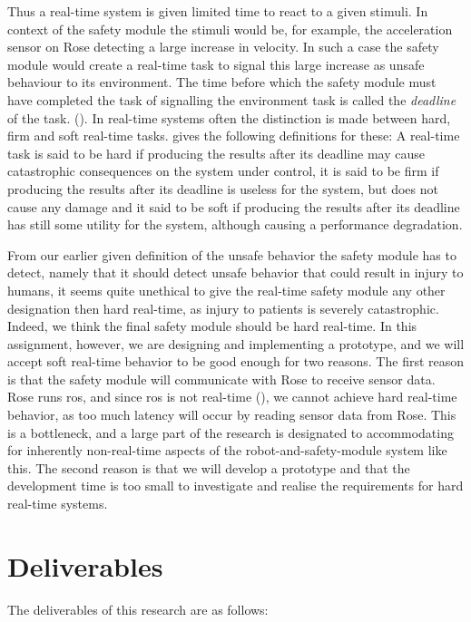 \documentclass[12pt]{scrreprt}
\begin{document}
Thus a real-time system is given limited time to react to a given stimuli. In context of the safety module the stimuli would be, for example, the acceleration sensor on Rose detecting a large increase in velocity. In such a case the safety module would create a real-time task to signal this large increase as unsafe behaviour to its environment. The time before which the safety module must have completed the task of signalling the environment task is called the \textit{deadline} of the task. (\cite{realtime_systems}). In real-time systems often the distinction is made between hard, firm and soft real-time tasks. \cite{buttazo} gives the following definitions for these: A real-time task is said to be hard if producing the results after its deadline
may cause catastrophic consequences on the system under control, it is said to be firm if producing the results after its deadline is useless for the system, but does not cause any damage and it said to be soft if producing the results after its deadline has still some utility for the system, although causing a performance degradation.
\par
From our earlier given definition of the unsafe behavior the safety module has to detect, namely that it should detect unsafe behavior that could result in injury to humans, it seems quite unethical to give the real-time safety module any other designation then hard real-time, as injury to patients is severely catastrophic. Indeed, we think the final safety module should be hard real-time. In this assignment, however, we are designing and implementing a prototype, and we will accept soft real-time behavior to be good enough for two reasons. The first reason is that the safety module will communicate with Rose to receive sensor data. Rose runs \acrfull{ros}, and since \acrlong{ros} is not real-time (\cite{why_is_ros_not_realtime}), we cannot achieve hard real-time behavior, as too much latency will occur by reading sensor data from Rose. This is a bottleneck, and a large part of the research is designated to accommodating for inherently non-real-time aspects of the robot-and-safety-module system like this. The second reason is that we will develop a prototype and that the development time is too small to investigate and realise the requirements for hard real-time systems.

\section{Deliverables}
\label{Deliverables}
The deliverables of this research are as follows:
\end{document}
